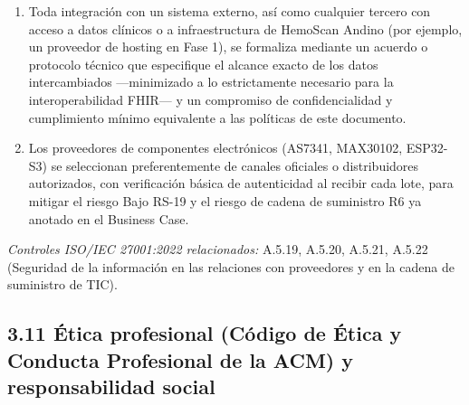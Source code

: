 \documentclass[11pt,a4paper]{article}
\providecommand{\tightlist}{%
  \setlength{\itemsep}{0pt}\setlength{\parskip}{0pt}}
\begin{document}
\begin{enumerate}
\def\labelenumi{\arabic{enumi}.}
\tightlist
\item
  Toda integración con un sistema externo, así como cualquier tercero con acceso a datos clínicos o a infraestructura de HemoScan Andino (por ejemplo, un proveedor de hosting en Fase 1), se formaliza mediante un acuerdo o protocolo técnico que especifique el alcance exacto de los datos intercambiados ---minimizado a lo estrictamente necesario para la interoperabilidad FHIR--- y un compromiso de confidencialidad y cumplimiento mínimo equivalente a las políticas de este documento.
\item
  Los proveedores de componentes electrónicos (AS7341, MAX30102, ESP32-S3) se seleccionan preferentemente de canales oficiales o distribuidores autorizados, con verificación básica de autenticidad al recibir cada lote, para mitigar el riesgo Bajo RS-19 y el riesgo de cadena de suministro R6 ya anotado en el Business Case.
\end{enumerate}

\emph{Controles ISO/IEC 27001:2022 relacionados:} A.5.19, A.5.20, A.5.21, A.5.22 (Seguridad de la información en las relaciones con proveedores y en la cadena de suministro de TIC).

\subsection{3.11 Ética profesional (Código de Ética y Conducta Profesional de la ACM) y responsabilidad social}\label{uxe9tica-profesional-cuxf3digo-de-uxe9tica-y-conducta-profesional-de-la-acm-y-responsabilidad-social}
\end{document}
